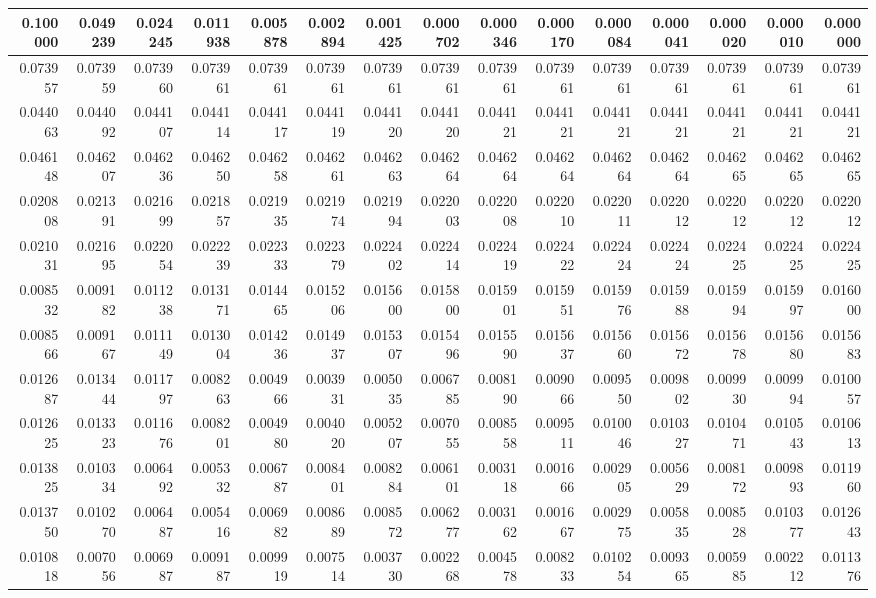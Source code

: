 \begin{tabular}{rrrrrrrrrrrrrrr}
\toprule
0.100000 & 0.049239 & 0.024245 & 0.011938 & 0.005878 & 0.002894 & 0.001425 & 0.000702 & 0.000346 & 0.000170 & 0.000084 & 0.000041 & 0.000020 & 0.000010 & 0.000000 \\
\midrule
0.073957 & 0.073959 & 0.073960 & 0.073961 & 0.073961 & 0.073961 & 0.073961 & 0.073961 & 0.073961 & 0.073961 & 0.073961 & 0.073961 & 0.073961 & 0.073961 & 0.073961 \\
0.044063 & 0.044092 & 0.044107 & 0.044114 & 0.044117 & 0.044119 & 0.044120 & 0.044120 & 0.044121 & 0.044121 & 0.044121 & 0.044121 & 0.044121 & 0.044121 & 0.044121 \\
0.046148 & 0.046207 & 0.046236 & 0.046250 & 0.046258 & 0.046261 & 0.046263 & 0.046264 & 0.046264 & 0.046264 & 0.046264 & 0.046264 & 0.046265 & 0.046265 & 0.046265 \\
0.020808 & 0.021391 & 0.021699 & 0.021857 & 0.021935 & 0.021974 & 0.021994 & 0.022003 & 0.022008 & 0.022010 & 0.022011 & 0.022012 & 0.022012 & 0.022012 & 0.022012 \\
0.021031 & 0.021695 & 0.022054 & 0.022239 & 0.022333 & 0.022379 & 0.022402 & 0.022414 & 0.022419 & 0.022422 & 0.022424 & 0.022424 & 0.022425 & 0.022425 & 0.022425 \\
0.008532 & 0.009182 & 0.011238 & 0.013171 & 0.014465 & 0.015206 & 0.015600 & 0.015800 & 0.015901 & 0.015951 & 0.015976 & 0.015988 & 0.015994 & 0.015997 & 0.016000 \\
0.008566 & 0.009167 & 0.011149 & 0.013004 & 0.014236 & 0.014937 & 0.015307 & 0.015496 & 0.015590 & 0.015637 & 0.015660 & 0.015672 & 0.015678 & 0.015680 & 0.015683 \\
0.012687 & 0.013444 & 0.011797 & 0.008263 & 0.004966 & 0.003931 & 0.005035 & 0.006785 & 0.008190 & 0.009066 & 0.009550 & 0.009802 & 0.009930 & 0.009994 & 0.010057 \\
0.012625 & 0.013323 & 0.011676 & 0.008201 & 0.004980 & 0.004020 & 0.005207 & 0.007055 & 0.008558 & 0.009511 & 0.010046 & 0.010327 & 0.010471 & 0.010543 & 0.010613 \\
0.013825 & 0.010334 & 0.006492 & 0.005332 & 0.006787 & 0.008401 & 0.008284 & 0.006101 & 0.003118 & 0.001666 & 0.002905 & 0.005629 & 0.008172 & 0.009893 & 0.011960 \\
0.013750 & 0.010270 & 0.006487 & 0.005416 & 0.006982 & 0.008689 & 0.008572 & 0.006277 & 0.003162 & 0.001667 & 0.002975 & 0.005835 & 0.008528 & 0.010377 & 0.012643 \\
0.010818 & 0.007056 & 0.006987 & 0.009187 & 0.009919 & 0.007514 & 0.003730 & 0.002268 & 0.004578 & 0.008233 & 0.010254 & 0.009365 & 0.005985 & 0.002212 & 0.011376 \\

\end{tabular}
